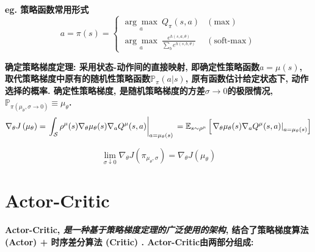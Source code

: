         \bf{eg.} 策略函数常用形式
        \begin{displaymath} a = \pi(s) = \left\{ \begin{array}{lr}
            \underset{a}{\arg\max}\ Q_\pi(s, a)    & (\text{max})\\
            \underset{a}{\arg\max}\ \frac{e^{h(s, a, \theta)}}{\sum_{b} e^{h(s, b, \theta)}}    & (\text{soft-max})
        \end{array} \right. \end{displaymath}
        
        \bf{确定策略梯度定理}: 采用状态-动作间的直接映射, 即确定性策略函数$a = \mu(s)$,  取代策略梯度中原有的随机性策略函数$\mathbb P_\pi(a|s)$, 原有函数估计给定状态下, 动作选择的概率. 确定性策略梯度, 是随机策略梯度的方差$\sigma \to 0$的极限情况, $\mathbb P_{\pi(\mu_\theta, \sigma \to 0)} \equiv \mu_\theta$. 
            $$\nabla_{\theta} J\left(\mu_{\theta}\right) =\left.\int_{\mathcal{S}} \rho^{\mu}(s) \nabla_{\theta} \mu_{\theta}(s) \nabla_{a} Q^{\mu}(s, a)\right|_{a=\mu_{\theta}(s)} \\=\mathbb{E}_{s \sim \rho^{\mu}}\left[\left.\nabla_{\theta} \mu_{\theta}(s) \nabla_{a} Q^{\mu}(s, a)\right|_{a=\mu_{\theta}(s)}\right]$$ 
            
            $$\lim _{\sigma \downarrow 0} \nabla_{\theta} J\left(\pi_{\mu_{\theta}, \sigma}\right)=\nabla_{\theta} J\left(\mu_{\theta}\right)$$

    \section{Actor-Critic}
        \bf{Actor-Critic}, \textit{是一种基于策略梯度定理的广泛使用的架构}, 结合了策略梯度算法 (Actor) + 时序差分算法 (Critic) . Actor-Critic由两部分组成:
    
